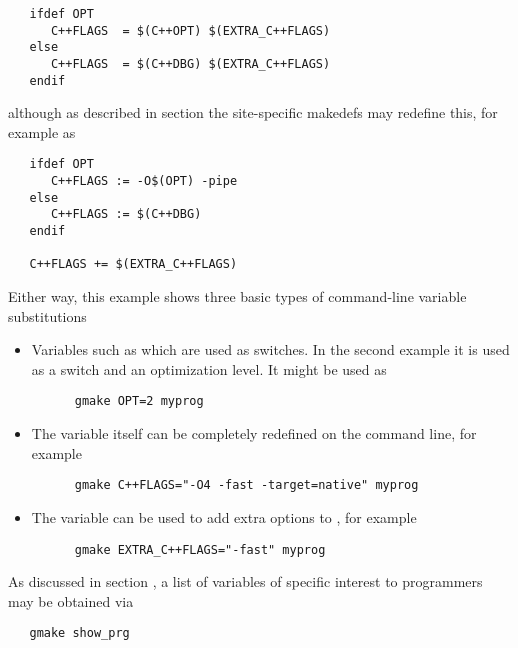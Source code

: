 \begin{verbatim}
   ifdef OPT
      C++FLAGS  = $(C++OPT) $(EXTRA_C++FLAGS)
   else
      C++FLAGS  = $(C++DBG) $(EXTRA_C++FLAGS)
   endif
\end{verbatim}

\noindent
although as described in section 
the site-specific makedefs may redefine this, for example as

\begin{verbatim}
   ifdef OPT
      C++FLAGS := -O$(OPT) -pipe
   else
      C++FLAGS := $(C++DBG)
   endif

   C++FLAGS += $(EXTRA_C++FLAGS)
\end{verbatim}

Either way, this example shows three basic types of command-line variable
substitutions

\begin{itemize}
\item
   Variables such as  which are used as switches.  In the second
   example it is used as a switch and an optimization level.  It might be used
   as

   \begin{verbatim}
      gmake OPT=2 myprog
   \end{verbatim}

\item
   The  variable itself can be completely redefined on the
   command line, for example

   \begin{verbatim}
      gmake C++FLAGS="-O4 -fast -target=native" myprog
   \end{verbatim}

\item
   The  variable can be used to add extra options to
   , for example

   \begin{verbatim}
      gmake EXTRA_C++FLAGS="-fast" myprog
   \end{verbatim}

\end{itemize}

\noindent
As discussed in section , a list of variables
of specific interest to programmers may be obtained via

\begin{verbatim}
   gmake show_prg
\end{verbatim}

